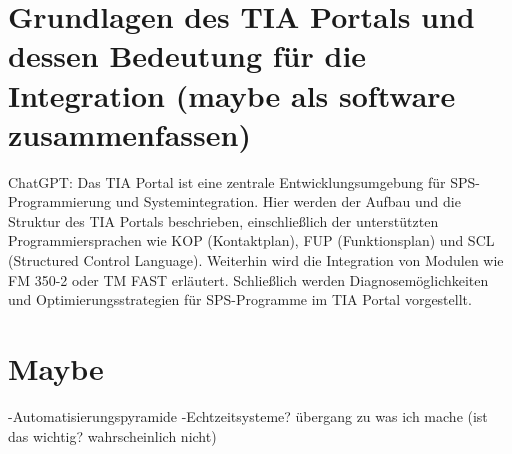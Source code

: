 \section{Grundlagen des TIA Portals und dessen Bedeutung für die Integration (maybe als software zusammenfassen)}  
ChatGPT:
Das TIA Portal ist eine zentrale Entwicklungsumgebung für SPS-Programmierung und Systemintegration.  
Hier werden der Aufbau und die Struktur des TIA Portals beschrieben, einschließlich der unterstützten Programmiersprachen wie KOP (Kontaktplan), FUP (Funktionsplan) und SCL (Structured Control Language).  
Weiterhin wird die Integration von Modulen wie FM 350-2 oder TM FAST erläutert.  
Schließlich werden Diagnosemöglichkeiten und Optimierungsstrategien für SPS-Programme im TIA Portal vorgestellt.  
\section{Maybe}
-Automatisierungspyramide
-Echtzeitsysteme? übergang zu was ich mache (ist das wichtig? wahrscheinlich nicht)